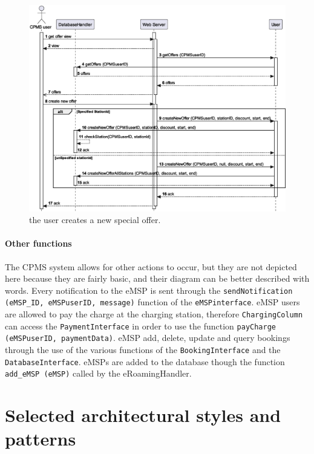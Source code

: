 \begin{figure}[h!]
    \centering
    \includegraphics[width=\columnwidth]{./images/sequences/cpms/offers}
    \caption{the user creates a new special offer.}
\end{figure}

\paragraph{Other functions} The CPMS system allows for other actions to occur, but they are not depicted here because they are fairly basic, and their diagram can be better described with words. Every notification to the eMSP is sent through the \texttt{sendNotification (eMSP\_ID, eMSPuserID, message)} function of the \texttt{eMSPinterface}. eMSP users are allowed to pay the charge at the charging station, therefore \texttt{ChargingColumn} can access the \texttt{PaymentInterface} in order to use the function \texttt{payCharge (eMSPuserID, paymentData)}. eMSP add, delete, update and query bookings through the use of the various  functions of the \texttt{BookingInterface} and the \texttt{DatabaseInterface}. eMSPs are added to the database though the function \texttt{add\_eMSP (eMSP)} called by the eRoamingHandler.

\pagebreak

\section{Selected architectural styles and patterns}

